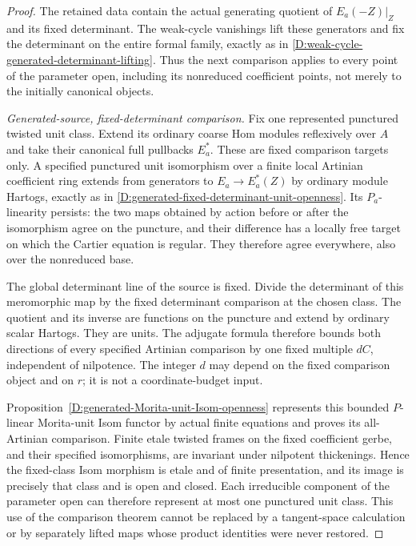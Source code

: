 \begin{proof}
The retained data contain the actual generating quotient
of $E_a(-Z)|_Z$ and its fixed determinant. The weak-cycle
vanishings lift these generators and fix the determinant
on the entire formal family, exactly as in
\ref{D:weak-cycle-generated-determinant-lifting}.
Thus the next comparison applies to every point of the
parameter open, including its nonreduced coefficient
points, not merely to the initially canonical objects.

\emph{Generated-source, fixed-determinant comparison.}
Fix one represented punctured twisted unit class. Extend
its ordinary coarse Hom modules reflexively over $A$ and
take their canonical full pullbacks $E_a^*$. These are
fixed comparison targets only. A specified punctured
unit isomorphism over a finite local Artinian coefficient
ring extends from generators to
$E_a\to E_a^*(Z)$ by ordinary module Hartogs, exactly
as in \ref{D:generated-fixed-determinant-unit-openness}.
Its $P_a$-linearity persists: the two maps obtained by
action before or after the isomorphism agree on the
puncture, and their difference has a locally free target
on which the Cartier equation is regular. They therefore
agree everywhere, also over the nonreduced base.

The global determinant line of the source is fixed.
Divide the determinant of this meromorphic map by the
fixed determinant comparison at the chosen class.
The quotient and its inverse are functions on the
puncture and extend by ordinary scalar Hartogs. They
are units. The adjugate formula therefore bounds both
directions of every specified Artinian comparison by
one fixed multiple $dC$, independent of nilpotence.
The integer $d$ may depend on the fixed comparison
object and on $r$; it is not a coordinate-budget input.

Proposition~\ref{D:generated-Morita-unit-Isom-openness}
represents this bounded
$P$-linear Morita-unit Isom functor by actual finite
equations and proves its all-Artinian comparison.
Finite etale twisted frames on the fixed coefficient
gerbe, and their specified isomorphisms, are invariant
under nilpotent thickenings. Hence the fixed-class Isom
morphism is etale and of finite presentation, and its
image is precisely that class and is open and closed.
Each irreducible component of the parameter open can
therefore represent at most one punctured unit class.
This use of the comparison theorem cannot be replaced
by a tangent-space calculation or by separately lifted
maps whose product identities were never restored.


\end{proof}

